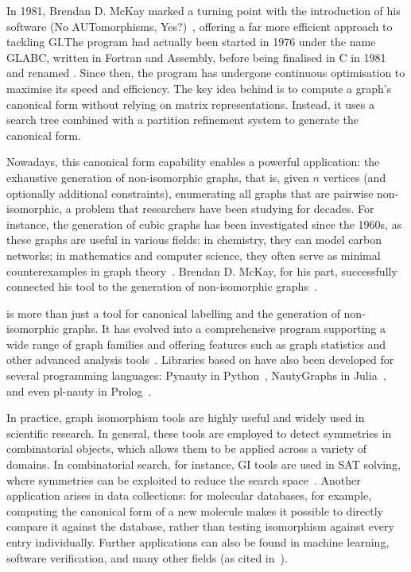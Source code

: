 In 1981, Brendan D. McKay marked a turning point with the introduction of his software \Naut{} (No AUTomorphisms, Yes?)~\cite{mckay1981practical}, offering a far more efficient approach to tackling GI.\@ The program had actually been started in 1976 under the name GLABC, written in Fortran and Assembly, before being finalised in C in 1981 and renamed \Naut{}. Since then, the program has undergone continuous optimisation to maximise its speed and efficiency. The key idea behind \Naut{} is to compute a graph's canonical form without relying on matrix representations. Instead, it uses a search tree combined with a partition refinement system to generate the canonical form.

Nowadays, this canonical form capability enables a powerful application: the exhaustive generation of non-isomorphic graphs, that is, given $n$ vertices (and optionally additional constraints), enumerating all graphs that are pairwise non-isomorphic, a problem that researchers have been studying for decades. For instance, the generation of cubic graphs has been investigated since the 1960s, as these graphs are useful in various fields: in chemistry, they can model carbon networks; in mathematics and computer science, they often serve as minimal counterexamples in graph theory~\cite{brinkmann2013history}. Brendan D. McKay, for his part, successfully connected his tool \Naut{} to the generation of non-isomorphic graphs~\cite{mckay1998isomorph}.

\Naut{} is more than just a tool for canonical labelling and the generation of non-isomorphic graphs. It has evolved into a comprehensive program supporting a wide range of graph families and offering features such as graph statistics and other advanced analysis tools~\cite{mckay2024nug}. Libraries based on \Naut{} have also been developed for several programming languages: Pynauty in Python~\cite{pynauty}, NautyGraphs in Julia~\cite{nautygraphs_jl}, and even pl-nauty in Prolog~\cite{frank2016logic}.

In practice, graph isomorphism tools are highly useful and widely used in scientific research. In general, these tools are employed to detect symmetries in combinatorial objects, which allows them to be applied across a variety of domains. In combinatorial search, for instance, GI tools are used in SAT solving, where symmetries can be exploited to reduce the search space~\cite{9617572}. Another application arises in data collections: for molecular databases, for example, computing the canonical form of a new molecule makes it possible to directly compare it against the database, rather than testing isomorphism against every entry individually. Further applications can also be found in machine learning, software verification, and many other fields (as cited in~\cite{grohe2020graph}).

